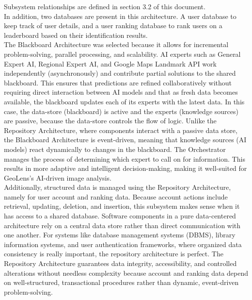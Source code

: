 \documentclass[]{article}
\begin{document}
\noindent Subsystem relationships are defined in section 3.2 of this document.\\

\noindent In addition, two databases are present in this architecture. A user database to keep track of user details, and a user ranking database to rank users on a leaderboard based on their identification results.\\

\noindent The Blackboard Architecture was selected because it allows for incremental problem-solving, parallel processing, and scalability. AI experts such as General Expert AI, Regional Expert AI, and Google Maps Landmark API work independently (asynchronously) and contribute partial solutions to the shared blackboard. This ensures that predictions are refined collaboratively without requiring direct interaction between AI models and that as fresh data becomes available, the blackboard updates each of its experts with the latest data. In this case, the data-store (blackboard) is active and the experts (knowledge sources) are passive, because the data-store controls the flow of logic. Unlike the Repository Architecture, where components interact with a passive data store, the Blackboard Architecture is event-driven, meaning that knowledge sources (AI models) react dynamically to changes in the blackboard. The Orchestrator manages the process of determining which expert to call on for information. This results in more adaptive and intelligent decision-making, making it well-suited for GeoLens’s AI-driven image analysis.\\

\noindent Additionally, structured data is managed using the Repository Architecture, namely for user account and ranking data. Because account actions include retrieval, updating, deletion, and insertion, this subsystem makes sense when it has access to a shared database. Software components in a pure data-centered architecture rely on a central data store rather than direct communication with one another. For systems like database management systems (DBMS), library information systems, and user authentication frameworks, where organized data consistency is really important, the repository architecture is perfect. The Repository Architecture guarantees data integrity, accessibility, and controlled alterations without needless complexity because account and ranking data depend on well-structured, transactional procedures rather than dynamic, event-driven problem-solving. \\
\end{document}
